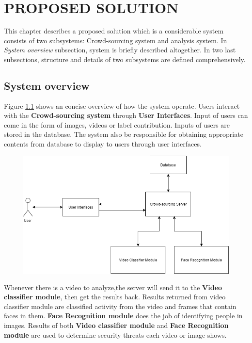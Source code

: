 \chapter{PROPOSED SOLUTION}
\label{chap:solution}

This chapter describes a proposed solution which is a considerable system consists of two subsystems: Crowd-sourcing system and  analysis system. In \textit{System overview} subsection, system is briefly described altogether. In two last subsections, structure and details of two subsystems are defined comprehensively.

\section{System overview}

Figure \ref{chap3:system_overview_basic} shows an concise overview of how the system operate. Users interact with the \textbf{Crowd-sourcing system} through \textbf{User Interfaces}. Input of users can come in the form of images, videos or label contribution. Inputs of users are stored in the database. The system also be responsible for obtaining appropriate contents from database to display to users through user interfaces.
\begin{center}
    \begin{figure}[H]
    \centering
    \includegraphics[width=1\columnwidth]{images/chap3/system_overview_basic.png}
    \label{chap3:system_overview_basic}
    \end{figure}
\end{center}
Whenever there is a video to analyze,the server will send it to the \textbf{Video classifier module}, then get the results back. Results returned from video classifier module are classified activity from the video and frames that contain faces in them. \textbf{Face Recognition module} does the job of identifying people in images. Results of both \textbf{Video classifier module} and \textbf{Face Recognition module} are used to determine security threats each video or image shows.
